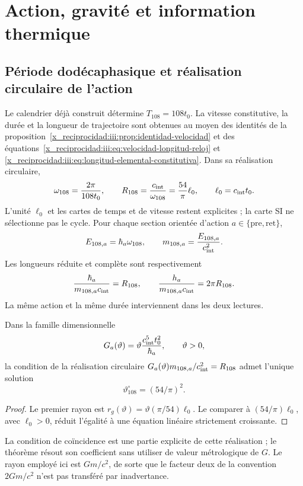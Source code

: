 

\chapter{Action, gravité et information thermique}
\label{x_reciprocidad:v:ant:sec:gravity}
\section{Période dodécaphasique et réalisation circulaire de l'action}
Le calendrier déjà construit détermine $T_{108}=108t_0$.
La vitesse constitutive, la durée et la longueur de trajectoire sont
obtenues au moyen des identités de la
proposition~\ref{x_reciprocidad:iii:prop:identidad-velocidad} et des
équations~\eqref{x_reciprocidad:iii:eq:velocidad-longitud-reloj} et
\eqref{x_reciprocidad:iii:eq:longitud-elemental-constitutiva}.
Dans sa réalisation circulaire,
\[
\omega_{108}=\frac{2\pi}{108t_0},\qquad
R_{108}=\frac{c_{\rm int}}{\omega_{108}}
=\frac{54}{\pi}\ell_0,\qquad \ell_0=c_{\rm int}t_0.
\]
L'unité $\ell_0$ et les cartes de temps et de vitesse restent
explicites ; la carte SI ne sélectionne pas le cycle.
Pour chaque section orientée d'action $a\in\{\mathrm{pre},\mathrm{ret}\}$,
\[
E_{108,a}=\hbar_a\omega_{108},\qquad
m_{108,a}=\frac{E_{108,a}}{c_{\rm int}^2}.
\]
Les longueurs réduite et complète sont respectivement
\[
\frac{\hbar_a}{m_{108,a}c_{\rm int}}=R_{108},
\qquad
\frac{h_a}{m_{108,a}c_{\rm int}}=2\pi R_{108}.
\]
La même action et la même durée interviennent dans les deux lectures.

\begin{proposition}
Dans la famille dimensionnelle
\[
G_a(\vartheta)=\vartheta\frac{c_{\rm int}^5t_0^2}{\hbar_a},
\qquad \vartheta>0,
\]
la condition de la réalisation circulaire
$G_a(\vartheta)m_{108,a}/c_{\rm int}^2=R_{108}$
admet l'unique solution
\[
\vartheta^\circ_{108}=(54/\pi)^2.
\]
\end{proposition}
\begin{proof}
Le premier rayon est
$r_g(\vartheta)=\vartheta(\pi/54)\ell_0$.
Le comparer à $(54/\pi)\ell_0$, avec $\ell_0>0$, réduit
l'égalité à une équation linéaire strictement croissante.
\end{proof}
La condition de coïncidence est une partie explicite de cette réalisation ;
le théorème résout son coefficient sans utiliser de valeur métrologique de $G$.
Le rayon employé ici est $Gm/c^2$, de sorte que le facteur deux
de la convention $2Gm/c^2$ n'est pas transféré par inadvertance.

